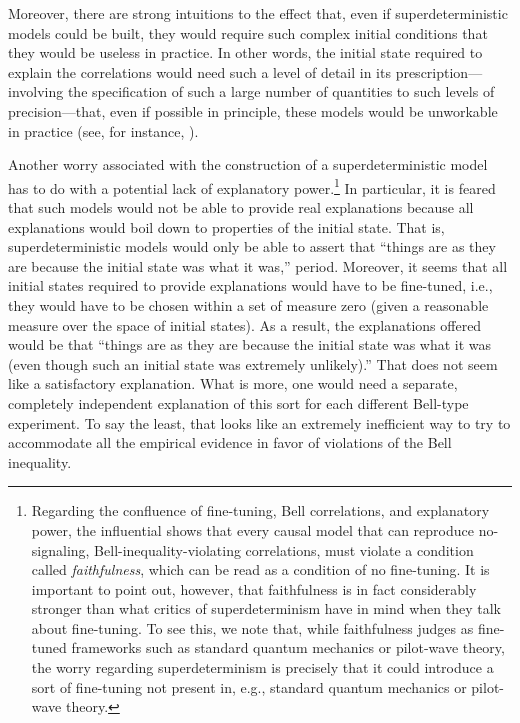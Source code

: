 \documentclass[letterpaper,12pt]{article}
\begin{document}
Moreover, there are strong intuitions to the effect that, even if superdeterministic models could be built, they would require such complex initial conditions that they would be useless in practice. In other words, the initial state required to explain the correlations would need such a level of detail in its prescription---involving the specification of such a large number of quantities to such levels of precision---that, even if possible in principle, these models would be unworkable in practice (see, for instance, \cite{Kronz}). 

Another worry associated with the construction of a superdeterministic model has to do with a potential lack of explanatory power.\footnote{Regarding the confluence of fine-tuning, Bell correlations, and explanatory power, the influential \cite{WS} shows that every causal model that can reproduce no-signaling, Bell-inequality-violating correlations, must violate a condition called \emph{faithfulness}, which can be read as a condition of no fine-tuning. It is important to point out, however, that faithfulness is in fact considerably stronger than what critics of superdeterminism have in mind when they talk about fine-tuning. To see this, we note that, while faithfulness judges as fine-tuned frameworks such as standard quantum mechanics or pilot-wave theory, the worry regarding superdeterminism is precisely that it could introduce a sort of fine-tuning not present in, e.g., standard quantum mechanics or pilot-wave theory.}  In particular, it is feared that such models would not be able to provide real explanations because all explanations would boil down to properties of the initial state. That is, superdeterministic models would only be able to assert that ``things are as they are because the initial state was what it was,'' period. Moreover, it seems that all initial states required to provide explanations would have to be fine-tuned, i.e., they would have to be chosen within a set of measure zero (given a reasonable measure over the space of initial states). As a result, the explanations offered would be that ``things are as they are because the initial state was what it was (even though such an initial state was extremely unlikely).'' That does not seem like a satisfactory explanation. What is more, one would need a separate, completely independent explanation of this sort for each different Bell-type experiment. To say the least, that looks like an extremely inefficient way to try to accommodate all the empirical evidence in favor of violations of the Bell inequality.
\end{document}
